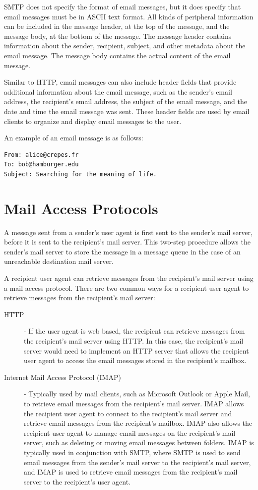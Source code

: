 \documentclass[12pt letter]{report}
\begin{document}
SMTP does not specify the format of email messages, but it does
specify that email messages must be in ASCII text format. All kinds
of peripheral information can be included in the message header, at
the top of the message, and the message body, at the bottom of the
message. The message header contains information about the sender,
recipient, subject, and other metadata about the email message. The
message body contains the actual content of the email message.

Similar to HTTP, email messages can also include header fields that provide
additional information about the email message, such as the sender's
email address, the recipient's email address, the subject of the
email message, and the date and time the email message was sent.
These header fields are used by email clients to organize and display
email messages to the user.

An example of an email message is as follows:
\begin{verbatim}
From: alice@crepes.fr
To: bob@hamburger.edu
Subject: Searching for the meaning of life.
\end{verbatim}

\section{Mail Access Protocols}

A message sent from a sender's user agent is first sent to the
sender's mail server, before it is sent to the recipient's mail
server. This two-step procedure allows the sender's mail server to
store the message in a message queue in the case of an unreachable
destination mail server.

A recipient user agent can retrieve messages from the recipient's
mail server using a mail access protocol. There are two common ways
for a recipient user agent to retrieve messages from the recipient's
mail server:
\begin{description}
  \item[HTTP]  - If the user agent is web based, the recipient can
    retrieve messages from the recipient's mail server using HTTP. In
    this case, the recipient's mail server would need to implement an
    HTTP server that allows the recipient user agent to access the
    email messages stored in the recipient's mailbox.
  \item[Internet Mail Access Protocol (IMAP)] - Typically used by
    mail clients, such as Microsoft Outlook or Apple Mail, to
    retrieve email messages from the recipient's mail server. IMAP
    allows the recipient user agent to connect to the recipient's
    mail server and retrieve email messages from the recipient's
    mailbox. IMAP also allows the recipient user agent to manage
    email messages on the recipient's mail server, such as deleting
    or moving email messages between folders. IMAP is typically used
    in conjunction with SMTP, where SMTP is used to send email
    messages from the sender's mail server to the recipient's mail
    server, and IMAP is used to retrieve email messages from the
    recipient's mail server to the recipient's user agent.
\end{description}
\end{document}
